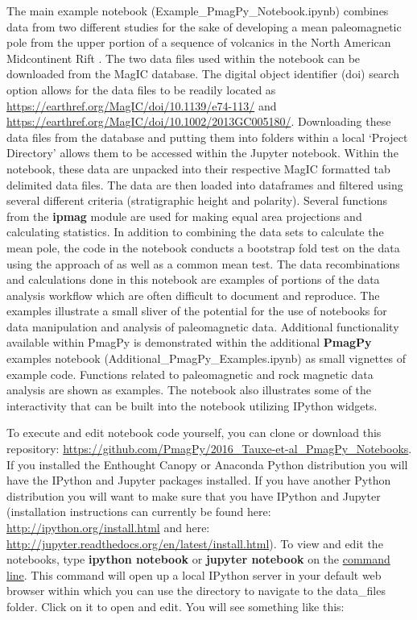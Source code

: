 \documentclass[11pt]{book}
\begin{document}
{{{{The main example notebook (Example\_PmagPy\_Notebook.ipynb) combines data from two different studies for the sake of developing a mean paleomagnetic pole from the upper portion of a sequence of volcanics in the North American Midcontinent Rift \citep{halls74, swansonhysell14}.  The two data files used within the notebook can be downloaded from the MagIC database. The digital object identifier (doi) search option allows for the data files to be readily located as  \url{https://earthref.org/MagIC/doi/10.1139/e74-113/} and \url{https://earthref.org/MagIC/doi/10.1002/2013GC005180/}. Downloading these data files from the database and putting them into folders within a local `Project Directory' allows them to be accessed within the Jupyter notebook. Within the notebook, these data are unpacked into their respective MagIC formatted tab delimited data files. The data are then loaded into dataframes and filtered using several different criteria (stratigraphic height and polarity).  Several functions from the {\bf ipmag} module are used for making equal area projections and calculating statistics. In addition to combining the data sets to calculate the mean pole, the code in the notebook conducts a bootstrap fold test on the data using the approach of \cite{tauxe94} as well as a common mean test. The data recombinations and calculations done in this notebook are examples of portions of the data analysis workflow which are often difficult to document and reproduce. The examples illustrate a small sliver of the potential for the use of notebooks for data manipulation and analysis of paleomagnetic data. Additional functionality available within PmagPy is demonstrated within the additional {\bf PmagPy} examples notebook (Additional\_PmagPy\_Examples.ipynb) as small vignettes of example code. Functions related to paleomagnetic and rock magnetic data analysis are shown as examples. The notebook also illustrates some of the interactivity that can be built into the notebook utilizing IPython widgets.

To execute and edit notebook code yourself, you can clone or download this repository: \url{https://github.com/PmagPy/2016_Tauxe-et-al_PmagPy_Notebooks}.  If you installed the Enthought Canopy or Anaconda Python distribution you will have the IPython and Jupyter packages installed. If you have another Python distribution you will want to make sure that you have IPython and Jupyter (installation instructions can currently be found here: \url{http://ipython.org/install.html} and here: \url{http://jupyter.readthedocs.org/en/latest/install.html}). To view and edit the notebooks,  type {\bf ipython notebook} or {\bf jupyter notebook} on the \href{#command_line}{command line}.  This command will open up a local IPython server in your default web browser within which you can use the directory to navigate to the data\_files folder. Click on it to open and edit. You will see something like this:

}}}}
\end{document}
